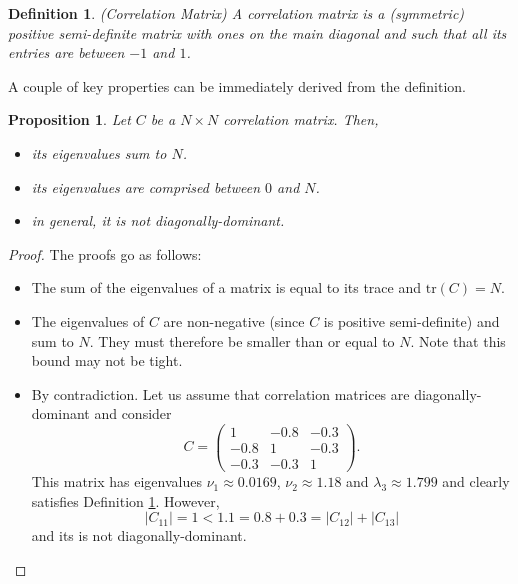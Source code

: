 \documentclass{article}
\newtheorem{proposition}{Proposition}
\newtheorem{definition}{Definition}
\begin{document}
\begin{definition}\label{CorrelationMatrix}
(Correlation Matrix) A correlation matrix is a (symmetric) positive semi-definite matrix with ones on the main diagonal and such that all its entries are between $-1$ and $1$. 
\end{definition}
A couple of key properties can be immediately derived from the definition.
\begin{proposition}
Let $C$ be a $N \times N$ correlation matrix. Then, 
\begin{itemize}
\item[(i)] its eigenvalues sum to $N$.
\item[(ii)] its eigenvalues are comprised between $0$ and $N$.
\item[(iii)] in general, it is not diagonally-dominant.
\end{itemize}
\end{proposition}
\begin{proof}The proofs go as follows:
\begin{itemize}
\item[(i)] The sum of the eigenvalues of a matrix is equal to its trace and $\mbox{tr}(C) = N$.
\item[(ii)] The eigenvalues of $C$ are non-negative (since $C$ is positive semi-definite) and sum to $N$. They must therefore be smaller than or equal to $N$. Note that this bound may not be tight.
\item[(iii)] By contradiction. Let us assume that correlation matrices are diagonally-dominant and consider
\begin{equation*}
C = \begin{pmatrix} 1 & -0.8 & -0.3 \\ -0.8 & 1 & -0.3 \\ -0.3 & -0.3 & 1 \end{pmatrix}.
\end{equation*}
This matrix has eigenvalues $\nu_1 \approx 0.0169$, $\nu_2 \approx 1.18$ and $\lambda_3 \approx 1.799$ and clearly satisfies Definition \ref{CorrelationMatrix}. However,
\begin{equation*}
|C_{11}| = 1 < 1.1 = 0.8 + 0.3 = |C_{12}| + |C_{13}|
\end{equation*}
and its is not diagonally-dominant.
\end{itemize}
\end{proof} 
\end{document}
